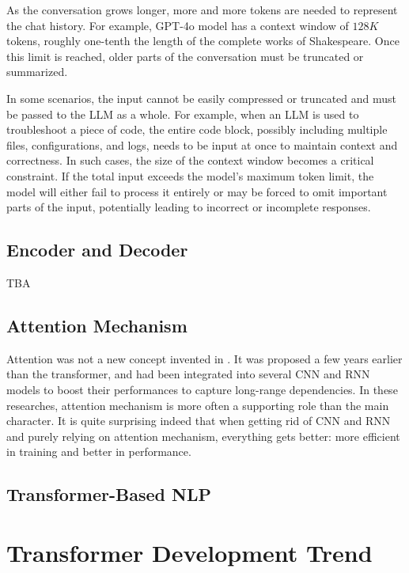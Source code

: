As the conversation grows longer, more and more tokens are needed to represent the chat history. For example, GPT-4o model has a context window of $128K$ tokens, roughly one-tenth the length of the complete works of Shakespeare. Once this limit is reached, older parts of the conversation must be truncated or summarized.

In some scenarios, the input cannot be easily compressed or truncated and must be passed to the LLM as a whole. For example, when an LLM is used to troubleshoot a piece of code, the entire code block, possibly including multiple files, configurations, and logs, needs to be input at once to maintain context and correctness. In such cases, the size of the context window becomes a critical constraint. If the total input exceeds the model's maximum token limit, the model will either fail to process it entirely or may be forced to omit important parts of the input, potentially leading to incorrect or incomplete responses.



\subsection{Encoder and Decoder}

TBA

\subsection{Attention Mechanism}

Attention was not a new concept invented in \cite{vaswani2017attention}. It was proposed a few years earlier than the transformer, and had been integrated into several CNN and RNN models to boost their performances to capture long-range dependencies. In these researches, attention mechanism is more often a supporting role than the main character. It is quite surprising indeed that when getting rid of CNN and RNN and purely relying on attention mechanism, everything gets better: more efficient in training and better in performance.

\subsection{Transformer-Based NLP}

\section{Transformer Development Trend}

